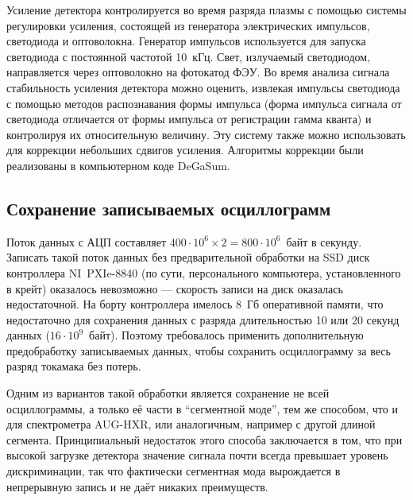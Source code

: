 Усиление детектора контролируется во время разряда плазмы с помощью системы регулировки усиления, состоящей из генератора электрических импульсов, светодиода и оптоволокна. Генератор импульсов используется для запуска светодиода с постоянной частотой 10~кГц. Свет, излучаемый светодиодом, направляется через оптоволокно на фотокатод ФЭУ. Во время анализа сигнала стабильность усиления детектора можно оценить, извлекая импульсы светодиода с помощью методов распознавания формы импульса (форма импульса сигнала от светодиода отличается от формы импульса от регистрации гамма кванта) и контролируя их относительную величину. Эту систему также можно использовать для коррекции небольших сдвигов усиления. Алгоритмы коррекции были реализованы в компьютерном коде DeGaSum.~\cite{Shevelev2021}


\subsection{Сохранение записываемых осциллограмм}

Поток данных с АЦП составляет $400 \cdot 10^6 \times 2 = 800 \cdot 10^6$~байт в секунду. Записать такой поток данных без предварительной обработки на SSD диск контроллера NI~PXIe-8840 (по сути, персонального компьютера, установленного в крейт) оказалось невозможно --- скорость записи на диск оказалась недостаточной. На борту контроллера имелось 8~Гб оперативной памяти, что недостаточно для сохранения данных с разряда длительностью 10 или 20 секунд данных ($16 \cdot 10^9$~байт). Поэтому требовалось применить дополнительную предобработку записываемых данных, чтобы сохранить осциллограмму за весь разряд токамака без потерь. 

Одним из вариантов такой обработки является сохранение не всей осциллограммы, а только её части в ``сегментной моде'', тем же способом, что и для спектрометра AUG-HXR, или аналогичным, например с другой длиной сегмента. Принципиальный недостаток этого способа заключается в том, что при высокой загрузке детектора значение сигнала почти всегда превышает уровень дискриминации, так что фактически сегментная мода вырождается в непрерывную запись и не даёт никаких преимуществ.
 
